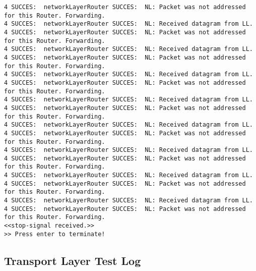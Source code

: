 \begin{lstlisting}[breaklines=true]
4 SUCCES:  networkLayerRouter SUCCES:  NL: Packet was not addressed for this Router. Forwarding.
4 SUCCES:  networkLayerRouter SUCCES:  NL: Received datagram from LL.
4 SUCCES:  networkLayerRouter SUCCES:  NL: Packet was not addressed for this Router. Forwarding.
4 SUCCES:  networkLayerRouter SUCCES:  NL: Received datagram from LL.
4 SUCCES:  networkLayerRouter SUCCES:  NL: Packet was not addressed for this Router. Forwarding.
4 SUCCES:  networkLayerRouter SUCCES:  NL: Received datagram from LL.
4 SUCCES:  networkLayerRouter SUCCES:  NL: Packet was not addressed for this Router. Forwarding.
4 SUCCES:  networkLayerRouter SUCCES:  NL: Received datagram from LL.
4 SUCCES:  networkLayerRouter SUCCES:  NL: Packet was not addressed for this Router. Forwarding.
4 SUCCES:  networkLayerRouter SUCCES:  NL: Received datagram from LL.
4 SUCCES:  networkLayerRouter SUCCES:  NL: Packet was not addressed for this Router. Forwarding.
4 SUCCES:  networkLayerRouter SUCCES:  NL: Received datagram from LL.
4 SUCCES:  networkLayerRouter SUCCES:  NL: Packet was not addressed for this Router. Forwarding.
4 SUCCES:  networkLayerRouter SUCCES:  NL: Received datagram from LL.
4 SUCCES:  networkLayerRouter SUCCES:  NL: Packet was not addressed for this Router. Forwarding.
4 SUCCES:  networkLayerRouter SUCCES:  NL: Received datagram from LL.
4 SUCCES:  networkLayerRouter SUCCES:  NL: Packet was not addressed for this Router. Forwarding.
<<stop-signal received.>>
>> Press enter to terminate!
\end{lstlisting}

\subsection{Transport Layer Test Log}
\label{apx:tl}

